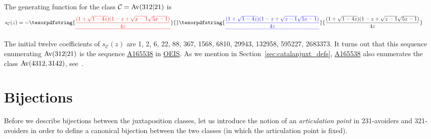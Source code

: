\documentclass[12pt, a4paper, twoside]{report}
\providecommand{\DIFaddtex}[1]{{\protect\color{blue}\uwave{#1}}} %
\providecommand{\DIFdeltex}[1]{{\protect\color{red}\sout{#1}}}                      %
\providecommand{\DIFaddbegin}{} %
\providecommand{\DIFaddend}{} %
\providecommand{\DIFdelbegin}{} %
\providecommand{\DIFdelend}{} %
\providecommand{\DIFadd}[1]{\texorpdfstring{\DIFaddtex{#1}}{#1}} %
\providecommand{\DIFdel}[1]{\texorpdfstring{\DIFdeltex{#1}}{}} %
\begin{document}
\begin{theorem}
The generating function for the class $\mathcal{C} = \mathrm{Av}(312|21)$ is
\begin{align*}
s_{\mathcal{C}}(z) &= -\DIFdelbegin \DIFdel{\frac{(1+\sqrt{1-4z})(1-z+\sqrt{x-1}\sqrt{5x-1})}{4z}
}\DIFdelend \DIFaddbegin \DIFadd{\frac{(1+\sqrt{1-4z})(1-z+\sqrt{z-1}\sqrt{5z-1})}{4z}
}\DIFaddend %
\end{align*}
\end{theorem}

The initial twelve coefficients of $s_{\mathcal{C}}(z)$ are 1, 2, 6, 22, 88, 367, 1568, 6810, 29943, 132958, 595227, 2683373. It turns out that this sequence enumerating $\mathrm{Av}(312|21)$ is the sequence \href{http://oeis.org/A165538}{A165538} in \href{http://oeis.org/}{OEIS}. As we mention in Section~\ref{sec:catalanjuxt_defs}, \href{http://oeis.org/A165538}{A165538} also enumerates the class $\mathrm{Av}(4312,3142)$, see~\cite{albert2012inflations}.

\section{Bijections}
\label{sec:bijections}
Before we describe bijections between the juxtaposition classes, let us introduce the notion of an \emph{articulation point} in 231-avoiders and 321-avoiders in order to define a canonical bijection between the two classes (in which the articulation point is fixed).
\end{document}
